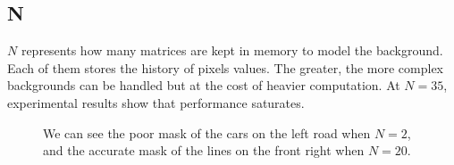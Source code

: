\subsection*{N}
$N$ represents how many matrices are kept in memory to model the background.
Each of them stores the history of pixels values.
The greater, the more complex backgrounds can be handled but at the cost of heavier
computation. At $N=35$, experimental results show that performance saturates.
\begin{figure}[!t]
\centering
{}
\newline
{}
\newline
{}
\caption{We can see the poor mask of the cars on the left road when $N=2$, and the
accurate mask of the lines on the front right when $N=20$.}
\end{figure}


